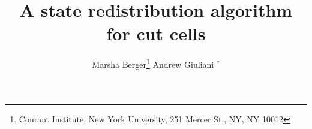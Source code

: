 \documentclass[12pt]{article}
\begin{document}
\title{A state redistribution algorithm for cut cells}
\author{Marsha Berger\footnote{Courant Institute, New York University, 251 Mercer St.,
NY, NY 10012}  \hspace{1in} Andrew Giuliani $^*$}

\maketitle

\begin{abstract}
\end{abstract}













\small


\end{document}
